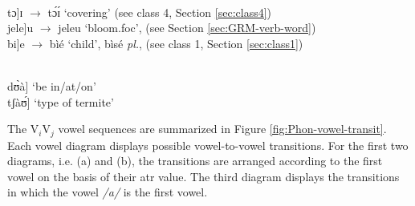 \begin{exe}
\ex\label{ex:V1V2vowel-seq}
\begin{xlist}

\ex   {\rm  V$_{i}$]-V$_{j}$ : a morpheme boundary intervenes}\\
tɔ]ɪ   $\rightarrow$ tɔ́ɪ́   {\rm `covering'} {\rm (see {\sc class 4},  
Section \ref{sec:class4})}\\
jele]u $\rightarrow$  jeleu  {\rm `bloom.{\sc foc}}', 
(see Section  \ref{sec:GRM-verb-word}) \\  
bi]e	 $\rightarrow$ bìé     {\rm `child'},   bìsé  {\it pl.},     
 {\rm  (see {\sc class 1},  
Section \ref{sec:class1})}	

\\
 dʊ̀à]    {\rm `be in/at/on'}\\
tʃàʊ́]    {\rm  `type of termite'}

\end{xlist}
\end{exe}

The V$_{i}$V$_{j}$ vowel sequences are  summarized in Figure 
\ref{fig:Phon-vowel-transit}.  Each vowel diagram displays possible 
vowel-to-vowel transitions. For the first two diagrams, i.e. (a) and (b), the 
transitions are arranged according to the first vowel on the basis of their {\sc 
atr} value. The third diagram displays the transitions in which the vowel {\it 
/a/}  is the first vowel. 

